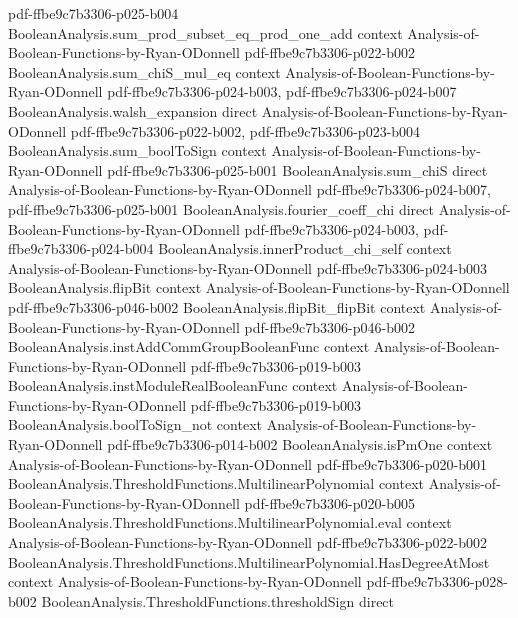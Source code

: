 \begin{lemma}
  {pdf-ffbe9c7b3306-p025-b004}
\proofstep
  {BooleanAnalysis.sum_prod_subset_eq_prod_one_add}
  {context}
  {Analysis-of-Boolean-Functions-by-Ryan-ODonnell}
  {pdf-ffbe9c7b3306-p022-b002}
\proofstep
  {BooleanAnalysis.sum_chiS_mul_eq}
  {context}
  {Analysis-of-Boolean-Functions-by-Ryan-ODonnell}
  {pdf-ffbe9c7b3306-p024-b003,
    pdf-ffbe9c7b3306-p024-b007}
\proofstep
  {BooleanAnalysis.walsh_expansion}
  {direct}
  {Analysis-of-Boolean-Functions-by-Ryan-ODonnell}
  {pdf-ffbe9c7b3306-p022-b002,
    pdf-ffbe9c7b3306-p023-b004}
\proofstep
  {BooleanAnalysis.sum_boolToSign}
  {context}
  {Analysis-of-Boolean-Functions-by-Ryan-ODonnell}
  {pdf-ffbe9c7b3306-p025-b001}
\proofstep
  {BooleanAnalysis.sum_chiS}
  {direct}
  {Analysis-of-Boolean-Functions-by-Ryan-ODonnell}
  {pdf-ffbe9c7b3306-p024-b007,
    pdf-ffbe9c7b3306-p025-b001}
\proofstep
  {BooleanAnalysis.fourier_coeff_chi}
  {direct}
  {Analysis-of-Boolean-Functions-by-Ryan-ODonnell}
  {pdf-ffbe9c7b3306-p024-b003,
    pdf-ffbe9c7b3306-p024-b004}
\proofstep
  {BooleanAnalysis.innerProduct_chi_self}
  {context}
  {Analysis-of-Boolean-Functions-by-Ryan-ODonnell}
  {pdf-ffbe9c7b3306-p024-b003}
\proofstep
  {BooleanAnalysis.flipBit}
  {context}
  {Analysis-of-Boolean-Functions-by-Ryan-ODonnell}
  {pdf-ffbe9c7b3306-p046-b002}
\proofstep
  {BooleanAnalysis.flipBit_flipBit}
  {context}
  {Analysis-of-Boolean-Functions-by-Ryan-ODonnell}
  {pdf-ffbe9c7b3306-p046-b002}
\proofstep
  {BooleanAnalysis.instAddCommGroupBooleanFunc}
  {context}
  {Analysis-of-Boolean-Functions-by-Ryan-ODonnell}
  {pdf-ffbe9c7b3306-p019-b003}
\proofstep
  {BooleanAnalysis.instModuleRealBooleanFunc}
  {context}
  {Analysis-of-Boolean-Functions-by-Ryan-ODonnell}
  {pdf-ffbe9c7b3306-p019-b003}
\proofstep
  {BooleanAnalysis.boolToSign_not}
  {context}
  {Analysis-of-Boolean-Functions-by-Ryan-ODonnell}
  {pdf-ffbe9c7b3306-p014-b002}
\proofstep
  {BooleanAnalysis.isPmOne}
  {context}
  {Analysis-of-Boolean-Functions-by-Ryan-ODonnell}
  {pdf-ffbe9c7b3306-p020-b001}
\proofstep
  {BooleanAnalysis.ThresholdFunctions.MultilinearPolynomial}
  {context}
  {Analysis-of-Boolean-Functions-by-Ryan-ODonnell}
  {pdf-ffbe9c7b3306-p020-b005}
\proofstep
  {BooleanAnalysis.ThresholdFunctions.MultilinearPolynomial.eval}
  {context}
  {Analysis-of-Boolean-Functions-by-Ryan-ODonnell}
  {pdf-ffbe9c7b3306-p022-b002}
\proofstep
  {BooleanAnalysis.ThresholdFunctions.MultilinearPolynomial.HasDegreeAtMost}
  {context}
  {Analysis-of-Boolean-Functions-by-Ryan-ODonnell}
  {pdf-ffbe9c7b3306-p028-b002}
\proofstep
  {BooleanAnalysis.ThresholdFunctions.thresholdSign}
  {direct}

\end{lemma}
